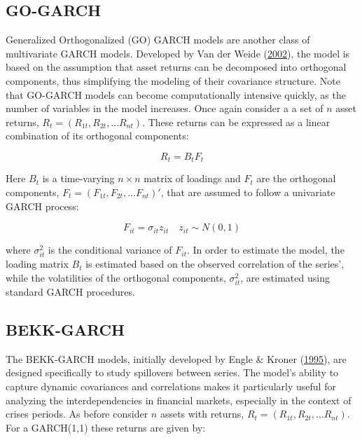 \documentclass[11pt,preprint, authoryear]{elsarticle}
\numberwithin{equation}{section}
\numberwithin{figure}{section}
\numberwithin{table}{section}
\begin{document}
\hypertarget{go-garch}{%
\subsection{GO-GARCH}\label{go-garch}}

Generalized Orthogonalized (GO) GARCH models are another class of
multivariate GARCH models. Developed by Van der Weide
(\protect\hyperlink{ref-VanDerWeide2002}{2002}), the model is based on
the assumption that asset returns can be decomposed into orthogonal
components, thus simplifying the modeling of their covariance structure.
Note that GO-GARCH models can become computationally intensive quickly,
as the number of variables in the model increases. Once again consider a
a set of \(n\) asset returns, \(R_t = (R_{1t}, R_{2t}, ... R_{nt})\).
These returns can be expressed as a linear combination of its orthogonal
components:

\begin{equation}
R_t = B_t F_t \label{eq4}
\end{equation}

Here \(B_t\) is a time-varying \(n \times n\) matrix of loadings and
\(F_t\) are the orthogonal components,
\(F_t = (F_{1t}, F_{2t}, ... F_{nt})'\), that are assumed to follow a
univariate GARCH process:

\begin{equation}
F_{it} = \sigma_{it}z_{it} \quad z_{it} \sim N(0,1)\label{eq5}
\end{equation}

where \(\sigma^2_{it}\) is the conditional variance of \(F_{it}\). In
order to estimate the model, the loading matrix \(B_t\) is estimated
based on the observed correlation of the series', while the volatilities
of the orthogonal components, \(\sigma^2_{it}\), are estimated using
standard GARCH procedures.

\hypertarget{bekk-garch}{%
\subsection{BEKK-GARCH}\label{bekk-garch}}

The BEKK-GARCH models, initially developed by Engle \& Kroner
(\protect\hyperlink{ref-Bekk1995}{1995}), are designed specifically to
study spillovers between series. The model's ability to capture dynamic
covariances and correlations makes it particularly useful for analyzing
the interdependencies in financial markets, especially in the context of
crises periods. As before consider \(n\) assets with returns,
\(R_t = (R_{1t}, R_{2t}, ... R_{nt})\). For a GARCH(1,1) these returns
are given by:
\end{document}
